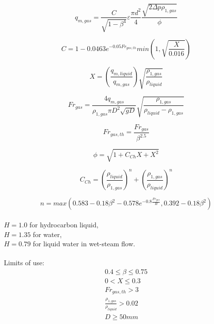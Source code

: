 \documentclass[journal]{IEEEtran}
\begin{document}
\begin{equation}
    q_{m,gas} = \frac{C}{\sqrt{1-\beta^{4}}}\varepsilon\frac{\pi d^{2}}{4}\frac{\sqrt{2\Delta p \rho_{1,gas}}}{\phi}
\end{equation}

\begin{equation}
    C = 1 - 0.0463 e^{-0.05 Fr_{gas,th}} min \left( 1, \sqrt{\frac{X}{0.016}} \right )
\end{equation}

\begin{equation}
    X = \left( \frac{q_{m,liquid}}{q_{m,gas}} \right)\sqrt{\frac{\rho_{1,gas}}{\rho_{liquid}}}
\end{equation}

\begin{equation}
    Fr_{gas} = \frac{4q_{m,gas}}{\rho_{1,gas} \pi D^{2} \sqrt{gD}} \sqrt{\frac{\rho_{1,gas}}{\rho_{liquid}-\rho_{1,gas}}}
\end{equation}

\begin{equation}
    Fr_{gas,th} = \frac{Fr_{gas}}{\beta ^{2.5}}
\end{equation}

\begin{equation}
    \phi = \sqrt{1+C_{Ch}X+X^2}
\end{equation}

\begin{equation}
    C_{Ch} = \left( \frac{\rho_{liquid}}{\rho_{1,gas}} \right) ^{n} +\left( \frac{\rho_{1,gas}}{\rho_{liquid}} \right) ^{n}
\end{equation}

\begin{equation}
    n = max \left( 0.583 - 0.18 \beta^{2} - 0.578 e^{-0.8 \frac{Fr_{gas}}{H}}, 0.392 - 0.18 \beta^{2} \right)
\end{equation}
\\
$H = 1.0$ for hydrocarbon liquid,\\
$H = 1.35$ for water,\\
$H = 0.79$ for liquid water in wet-steam flow.
\\
\\
Limits of use: \\
\begin{equation*}
\begin{aligned}
    0.4 \leq \beta \leq 0.75 \\
    0 < X \leq 0.3 \\
    Fr_{gas,th} > 3 \\
    \frac{\rho_{1,gas}}{\rho_{liquid}} > 0.02 \\
    D \geq 50 mm
\end{aligned}
\end{equation*}
\end{document}
